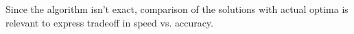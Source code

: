 Since the algorithm isn't exact, comparison of the solutions with actual optima is relevant to express tradeoff in speed vs. accuracy.
